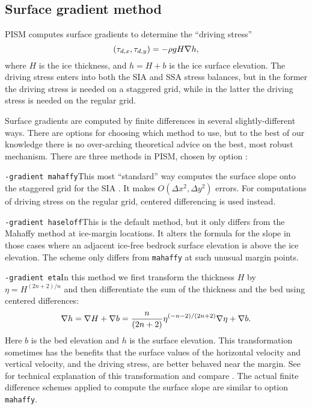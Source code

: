 \subsection{Surface gradient method}
\label{subsect:gradient}

PISM computes surface gradients to determine the ``driving stress''
	$$(\tau_{d,x},\tau_{d,y}) = - \rho g H \nabla h,$$
where $H$ is the ice thickness, and $h = H+b$ is the ice surface elevation.  The driving stress enters into both the SIA and SSA stress balances, but in the former the driving stress is needed on a staggered grid, while in the latter the driving stress is needed on the regular grid.

Surface gradients are computed by finite differences in several slightly-different ways.  There are options for choosing which method to use, but to the best of our knowledge there is no over-arching theoretical advice on the best, most robust mechanism.  There are three methods in PISM, chosen by option :

\noindent\texttt{-gradient mahaffy}\quad  This most ``standard'' way computes the surface slope onto the staggered grid for the SIA \cite{Mahaffy}.  It makes $O(\Delta x^2,\Delta y^2)$ errors.  For computations of driving stress on the regular grid, centered differencing is used instead.

\noindent\texttt{-gradient haseloff}\quad  This is the default method, but it only differs from the Mahaffy method at ice-margin locations.  It alters the formula for the slope in those cases where an adjacent ice-free bedrock surface elevation is above the ice elevation.  The scheme only differs from \texttt{mahaffy} at such unusual margin points.

\noindent\texttt{-gradient eta}\quad  In this method we first transform the thickness $H$ by $\eta = H^{(2n+2)/n}$ and then differentiate the sum of the thickness and the bed using centered differences:
	$$\nabla h = \nabla H + \nabla b = \frac{n}{(2n+2)} \eta^{(-n-2)/(2n+2)} \nabla \eta + \nabla b.$$
Here $b$ is the bed elevation and $h$ is the surface elevation.  This transformation sometimes has the benefits that the surface values of the horizontal velocity and vertical velocity, and the driving stress, are better behaved near the margin.  See \cite{BLKCB,CDDSV} for technical explanation of this transformation and compare \cite{SaitoMargin}.  The actual finite difference schemes applied to compute the surface slope are similar to option \texttt{mahaffy}.


